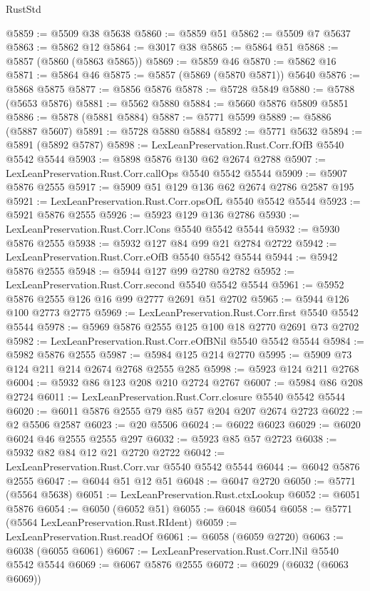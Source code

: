 \begin{lexlean}{RustStd}
\begin{coremodule}
{\begin{coremodule}
{{{{{{{{{{{{{{{{{{{{{{{{{{@5859 := @5509 @38 @5638
@5860 := @5859 @51
@5862 := @5509 @7 @5637
@5863 := @5862 @12
@5864 := @3017 @38
@5865 := @5864 @51
@5868 := @5857 (@5860 (@5863 @5865))
@5869 := @5859 @46
@5870 := @5862 @16
@5871 := @5864 @46
@5875 := @5857 (@5869 (@5870 @5871)) @5640
@5876 := @5868 @5875
@5877 := @5856 @5876
@5878 := @5728 @5849
@5880 := @5788 (@5653 @5876)
@5881 := @5562 @5880
@5884 := @5660 @5876 @5809 @5851
@5886 := @5878 (@5881 @5884)
@5887 := @5771 @5599
@5889 := @5886 (@5887 @5607)
@5891 := @5728 @5880 @5884
@5892 := @5771 @5632
@5894 := @5891 (@5892 @5787)
@5898 := LexLeanPreservation.Rust.Corr.fOfB @5540 @5542 @5544
@5903 := @5898 @5876 @130 @62 @2674 @2788
@5907 := LexLeanPreservation.Rust.Corr.callOps @5540 @5542 @5544
@5909 := @5907 @5876 @2555
@5917 := @5909 @51 @129 @136 @62 @2674 @2786 @2587 @195
@5921 := LexLeanPreservation.Rust.Corr.opsOfL @5540 @5542 @5544
@5923 := @5921 @5876 @2555
@5926 := @5923 @129 @136 @2786
@5930 := LexLeanPreservation.Rust.Corr.lCons @5540 @5542 @5544
@5932 := @5930 @5876 @2555
@5938 := @5932 @127 @84 @99 @21 @2784 @2722
@5942 := LexLeanPreservation.Rust.Corr.eOfB @5540 @5542 @5544
@5944 := @5942 @5876 @2555
@5948 := @5944 @127 @99 @2780 @2782
@5952 := LexLeanPreservation.Rust.Corr.second @5540 @5542 @5544
@5961 := @5952 @5876 @2555 @126 @16 @99 @2777 @2691 @51 @2702
@5965 := @5944 @126 @100 @2773 @2775
@5969 := LexLeanPreservation.Rust.Corr.first @5540 @5542 @5544
@5978 := @5969 @5876 @2555 @125 @100 @18 @2770 @2691 @73 @2702
@5982 := LexLeanPreservation.Rust.Corr.eOfBNil @5540 @5542 @5544
@5984 := @5982 @5876 @2555
@5987 := @5984 @125 @214 @2770
@5995 := @5909 @73 @124 @211 @214 @2674 @2768 @2555 @285
@5998 := @5923 @124 @211 @2768
@6004 := @5932 @86 @123 @208 @210 @2724 @2767
@6007 := @5984 @86 @208 @2724
@6011 := LexLeanPreservation.Rust.Corr.closure @5540 @5542 @5544
@6020 := @6011 @5876 @2555 @79 @85 @57 @204 @207 @2674 @2723
@6022 := @2 @5506 @2587
@6023 := @20 @5506
@6024 := @6022 @6023
@6029 := @6020 @6024 @46 @2555 @2555 @297
@6032 := @5923 @85 @57 @2723
@6038 := @5932 @82 @84 @12 @21 @2720 @2722
@6042 := LexLeanPreservation.Rust.Corr.var @5540 @5542 @5544
@6044 := @6042 @5876 @2555
@6047 := @6044 @51 @12 @51
@6048 := @6047 @2720
@6050 := @5771 (@5564 @5638)
@6051 := LexLeanPreservation.Rust.ctxLookup
@6052 := @6051 @5876
@6054 := @6050 (@6052 @51)
@6055 := @6048 @6054
@6058 := @5771 (@5564 LexLeanPreservation.Rust.RIdent)
@6059 := LexLeanPreservation.Rust.readOf
@6061 := @6058 (@6059 @2720)
@6063 := @6038 (@6055 @6061)
@6067 := LexLeanPreservation.Rust.Corr.lNil @5540 @5542 @5544
@6069 := @6067 @5876 @2555
@6072 := @6029 (@6032 (@6063 @6069))
}}}}}}}}}}}}}}}}}}}}}}}}}}
\end{coremodule}}
\end{coremodule}
\end{lexlean}

